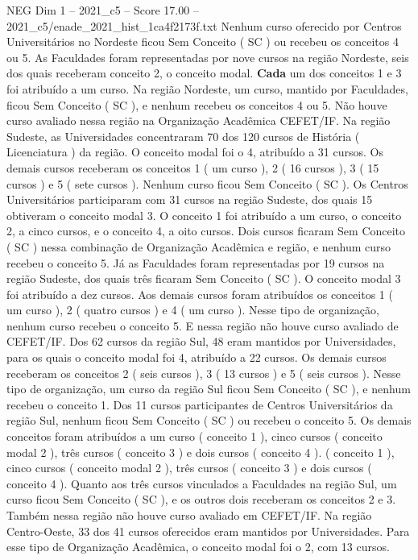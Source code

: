 \begin{textsample}{NEG Dim 1 – 2021\_c5 – Score 17.00 – 2021\_c5/enade\_2021\_hist\_1ca4f2173f.txt}
Nenhum curso oferecido por Centros Universitários no Nordeste ficou Sem Conceito ( SC ) ou recebeu os conceitos 4 ou 5.
As Faculdades foram representadas por nove cursos na região Nordeste, seis dos quais receberam conceito 2, o conceito modal. \textbf{Cada} um dos conceitos 1 e 3 foi atribuído a um curso.
Na região Nordeste, um curso, mantido por Faculdades, ficou Sem Conceito ( SC ), e nenhum recebeu os conceitos 4 ou 5.
Não houve curso avaliado nessa região na Organização Acadêmica CEFET/IF.
Na região Sudeste, as Universidades concentraram 70 dos 120 cursos de História ( Licenciatura ) da região.
O conceito modal foi o 4, atribuído a 31 cursos.
Os demais cursos receberam os conceitos 1 ( um curso ), 2 ( 16 cursos ), 3 ( 15 cursos ) e 5 ( sete cursos ).
Nenhum curso ficou Sem Conceito ( SC ).
Os Centros Universitários participaram com 31 cursos na região Sudeste, dos quais 15 obtiveram o conceito modal 3.
O conceito 1 foi atribuído a um curso, o conceito 2, a cinco cursos, e o conceito 4, a oito cursos.
Dois cursos ficaram Sem Conceito ( SC ) nessa combinação de Organização Acadêmica e região, e nenhum curso recebeu o conceito 5.
Já as Faculdades foram representadas por 19 cursos na região Sudeste, dos quais três ficaram Sem Conceito ( SC ).
O conceito modal 3 foi atribuído a dez cursos.
Aos demais cursos foram atribuídos os conceitos 1 ( um curso ), 2 ( quatro cursos ) e 4 ( um curso ).
Nesse tipo de organização, nenhum curso recebeu o conceito 5.
E nessa região não houve curso avaliado de CEFET/IF.
Dos 62 cursos da região Sul, 48 eram mantidos por Universidades, para os quais o conceito modal foi 4, atribuído a 22 cursos.
Os demais cursos receberam os conceitos 2 ( seis cursos ), 3 ( 13 cursos ) e 5 ( seis cursos ).
Nesse tipo de organização, um curso da região Sul ficou Sem Conceito ( SC ), e nenhum recebeu o conceito 1.
Dos 11 cursos participantes de Centros Universitários da região Sul, nenhum ficou Sem Conceito ( SC ) ou recebeu o conceito 5.
Os demais conceitos foram atribuídos a um curso ( conceito 1 ), cinco cursos ( conceito modal 2 ), três cursos ( conceito 3 ) e dois cursos ( conceito 4 ). ( conceito 1 ), cinco cursos ( conceito modal 2 ), três cursos ( conceito 3 ) e dois cursos ( conceito 4 ).
Quanto aos três cursos vinculados a Faculdades na região Sul, um curso ficou Sem Conceito ( SC ), e os outros dois receberam os conceitos 2 e 3.
Também nessa região não houve curso avaliado em CEFET/IF.
Na região Centro-Oeste, 33 dos 41 cursos oferecidos eram mantidos por Universidades.
Para esse tipo de Organização Acadêmica, o conceito modal foi o 2, com 13 cursos.

\end{textsample}
